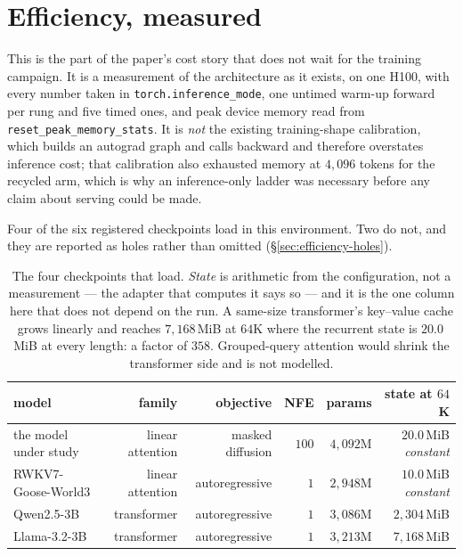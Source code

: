 \documentclass[11pt]{article}
\begin{document}
\section{Efficiency, measured}
\label{sec:efficiency}

This is the part of the paper's cost story that does not wait for the training campaign. It
is a measurement of the architecture as it exists, on one H100, with every number taken in
\texttt{torch.inference\_mode}, one untimed warm-up forward per rung and five timed ones, and
peak device memory read from \texttt{reset\_peak\_memory\_stats}. It is \emph{not} the
existing training-shape calibration, which builds an autograd graph and calls backward and
therefore overstates inference cost; that calibration also exhausted memory at $4{,}096$
tokens for the recycled arm, which is why an inference-only ladder was necessary before any
claim about serving could be made.

Four of the six registered checkpoints load in this environment. Two do not, and they are
reported as holes rather than omitted (\S\ref{sec:efficiency-holes}).

\begin{table}[t]
\centering
\begin{tabular}{lrrrrr}
\toprule
model & family & objective & NFE & params & state at $64$K \\
\midrule
the model under study & linear attention & masked diffusion & $100$ & $4,092$M & $20.0$\,MiB \emph{constant} \\
RWKV7-Goose-World3   & linear attention & autoregressive   & $1$   & $2,948$M & $10.0$\,MiB \emph{constant} \\
Qwen2.5-3B           & transformer      & autoregressive   & $1$   & $3,086$M & $2{,}304$\,MiB \\
Llama-3.2-3B         & transformer      & autoregressive   & $1$   & $3,213$M & $7{,}168$\,MiB \\
\bottomrule
\end{tabular}
\caption{The four checkpoints that load. \emph{State} is arithmetic from the configuration,
not a measurement --- the adapter that computes it says so --- and it is the one column here
that does not depend on the run. A same-size transformer's key--value cache grows linearly
and reaches $7{,}168$\,MiB at $64$K where the recurrent state is $20.0$\,MiB at every
length: a factor of $358$. Grouped-query attention would shrink the transformer side and is
not modelled.}
\label{tab:eff-state}
\end{table}
\end{document}
